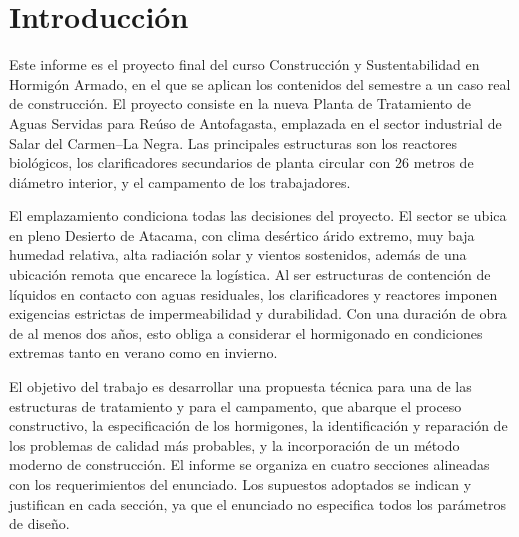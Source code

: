 \section{Introducción}

Este informe es el proyecto final del curso Construcción y Sustentabilidad en Hormigón Armado, en el que se aplican los contenidos del semestre a un caso real de construcción. El proyecto consiste en la nueva Planta de Tratamiento de Aguas Servidas para Reúso de Antofagasta, emplazada en el sector industrial de Salar del Carmen--La Negra. Las principales estructuras son los reactores biológicos, los clarificadores secundarios de planta circular con 26 metros de diámetro interior, y el campamento de los trabajadores.

El emplazamiento condiciona todas las decisiones del proyecto. El sector se ubica en pleno Desierto de Atacama, con clima desértico árido extremo, muy baja humedad relativa, alta radiación solar y vientos sostenidos, además de una ubicación remota que encarece la logística. Al ser estructuras de contención de líquidos en contacto con aguas residuales, los clarificadores y reactores imponen exigencias estrictas de impermeabilidad y durabilidad. Con una duración de obra de al menos dos años, esto obliga a considerar el hormigonado en condiciones extremas tanto en verano como en invierno.

El objetivo del trabajo es desarrollar una propuesta técnica para una de las estructuras de tratamiento y para el campamento, que abarque el proceso constructivo, la especificación de los hormigones, la identificación y reparación de los problemas de calidad más probables, y la incorporación de un método moderno de construcción. El informe se organiza en cuatro secciones alineadas con los requerimientos del enunciado. Los supuestos adoptados se indican y justifican en cada sección, ya que el enunciado no especifica todos los parámetros de diseño.
